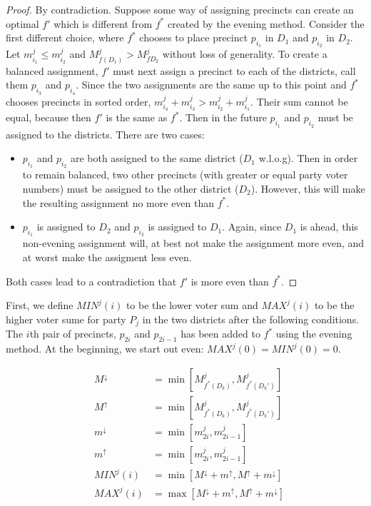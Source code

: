 \documentclass[12pt]{article}
\begin{document}
\begin{proof}
By contradiction. Suppose some way of assigning precincts
can create an optimal $f'$ which is different from $f^{*}$ created by
the evening method.
Consider the first different choice, where
$f^{*}$ chooses to place precinct $p_{i_1}$ in $D_1$ and $p_{i_2}$ in
$D_2$. Let $m^{j}_{i_1} \le m^{j}_{i_2}$
and $M^{j}_{f(D_1)} > M^{j}_{f{D_2}}$ without loss of generality.
To create a balanced assignment, $f'$ must next assign a precinct to each
of the districts, call them $p_{i_3}$ and $p_{i_4}$. Since the two assignments
are the same up to this point and $f^{*}$ chooses precincts in
sorted order,
$m^{j}_{i_4} + m^{j}_{i_3} > m^{j}_{i_2} + m^{j}_{i_1}$. Their
sum cannot be equal, because then $f'$ is the same as $f^{*}$. Then in the
future $p_{i_1}$ and $p_{i_2}$ must be assigned to the districts.
There are two cases:

\begin{itemize}
\item $p_{i_1}$ and $p_{i_2}$ are both assigned to the same district
($D_1$ w.l.o.g).
Then in order to remain balanced, two other precincts (with greater or equal
party voter numbers) must be assigned to the other district ($D_2$).
However, this will make the resulting assignment no more even than $f^{*}$.
\item
$p_{i_1}$ is assigned to $D_2$ and $p_{i_2}$ is assigned to $D_1$.
Again, since $D_1$ is ahead, this non-evening assignment will,
at best not make the assignment more even, and at worst make the
assigment less even.
\end{itemize}

Both cases lead to a contradiction that $f'$ is more even than $f^{*}$.

\end{proof}

First, we define $MIN^{j}(i)$ to be the lower voter sum
and $MAX^{j}(i)$ to be the higher voter sume for party $P_j$ in the
two districts after the following conditions.
The $i$th pair of
precincts, $p_{2i}$ and $p_{2i-1}$ has been added
to $f^{*}$  using the evening method.
At the beginning, we start out even: $MAX^{j}(0) = MIN^{j}(0) = 0$.

\begin{eqnarray}
& M^\downarrow & = \min\left[M^{j}_{f^{*}(D_k)},M^{j}_{f^{*}(D_k')}\right]\\
& M^\uparrow   & = \min\left[M^{j}_{f^{*}(D_k)},M^{j}_{f^{*}(D_k')}\right]\\
& m^\downarrow &=  \min\left[m^{j}_{2i}, m^{j}_{2i-1}\right]\\
& m^\uparrow   &=  \min\left[m^{j}_{2i}, m^{j}_{2i-1}\right]\\
\label{min-gm:eqn}
& MIN^{j}(i) & = \min\left[M^\downarrow + m^\uparrow,
                           M^\uparrow   + m^\downarrow\right]\\
& MAX^{j}(i) & = \max\left[M^\downarrow + m^\uparrow,
                           M^\uparrow   + m^\downarrow\right]
\label{max-gm:eqn}
\end{eqnarray}
\end{document}
